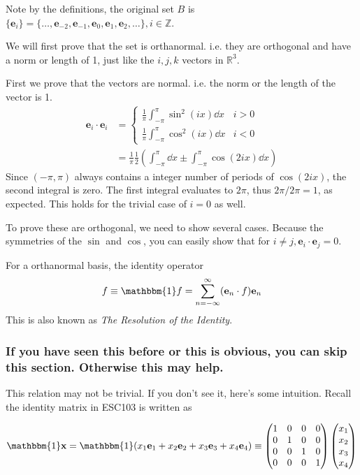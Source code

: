 \documentclass{article}
\newcommand{\ve}{\mathbf}
\newcommand{\R}{\mathbb{R}}
\newcommand{\1}{\mathbbm{1}}
\begin{document}
Note by the definitions, the original set $B$ is $\{\ve e_i\}=\{\dots,\ve e_{-2},\ve e_{-1}, \ve e_0, \ve e_1, \ve e_2, \dots\}, i\in\mathbb{Z}$.

We will first prove that the set is orthanormal. i.e. they are orthogonal and have a norm or length of 1, just like the $i,j,k$ vectors in $\R^3$. 

\begin{prooof}
    First we prove that the vectors are normal. i.e. the norm or the length of the vector is 1. 
    \begin{align}
        \ve e_i\cdot \ve e_i&=\begin{cases}
            \frac{1}{\pi}\int_{-\pi}^\pi \sin^2(ix)\dd x & i>0\\
            \frac{1}{\pi}\int_{-\pi}^\pi \cos^2(ix)\dd x & i<0
        \end{cases}\\
        &=\frac{1}{\pi}\frac{1}{2}\left(\int_{-\pi}^\pi \dd x \pm \int_{-\pi}^\pi \cos(2ix)\dd x\right)
    \end{align}
    Since $(-\pi,\pi)$ always contains a integer number of periods of $\cos(2ix)$, the second integral is zero. The first integral evaluates to $2\pi$, thus $2\pi/2\pi=1$, as expected. This holds for the trivial case of $i=0$ as well.

    To prove these are orthogonal, we need to show several cases. Because the symmetries of the $\sin$ and $\cos$, you can easily show that for $i\neq j, \ve e_i\cdot\ve e_j=0$.
\end{prooof}

For a orthanormal basis, the identity operator
\begin{equation}
    f \equiv \1 f=\sum_{n=-\infty}^\infty (\ve e_n\cdot f)\ve e_n\label{6}
\end{equation}
This is also known as \textit{The Resolution of the Identity}.

\subsubsection{If you have seen this before or this is obvious, you can skip this section. Otherwise this may help.}
This relation may not be trivial. If you don't see it, here's some intuition. Recall the identity matrix in ESC103 is written as 

\begin{equation}
    \1\ve x=\1(x_1\ve e_1+x_2\ve e_2+x_3\ve e_3+x_4\ve e_4)\equiv\begin{pmatrix}
        1 & 0 & 0 & 0\\
        0 & 1 & 0 & 0\\
        0 & 0 & 1 & 0\\
        0 & 0 & 0 & 1
    \end{pmatrix}\begin{pmatrix}
        x_1\\x_2\\x_3\\x_4
    \end{pmatrix}
\end{equation}
\end{document}
